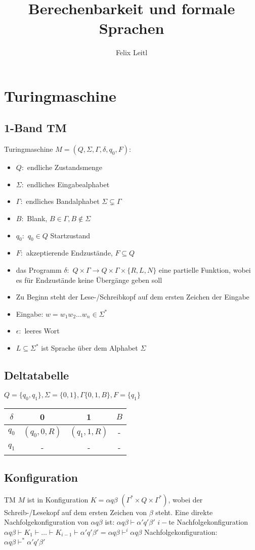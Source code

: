 \documentclass{article}
\title{Berechenbarkeit und formale Sprachen}
\author{Felix Leitl}
\begin{document}
\maketitle
\tableofcontents
\newpage
\section{Turingmaschine}
\subsection{1-Band TM}
Turingmaschine $M=(Q, \Sigma, \Gamma, \delta, q_0, F)$:
\begin{itemize}
	\item $Q:$ endliche Zustandsmenge
	\item $\Sigma:$ endliches Eingabealphabet
	\item $\Gamma:$ endliches Bandalphabet $\Sigma \subsetneq \Gamma$
	\item $B:$ Blank, $B\in\Gamma, B\notin\Sigma$
	\item $q_0:$ $q_0\in Q$ Startzustand
	\item $F:$ akzeptierende Endzustände, $F\subseteq Q$
	\item das Programm $\delta:$ $Q\times\Gamma\to Q\times\Gamma\times\{R,L,N\}$ eine partielle Funktion, wobei es für Endzustände keine Übergänge geben soll
	\item Zu Beginn steht der Lese-/Schreibkopf auf dem ersten Zeichen der Eingabe
	\item Eingabe: $w=w_1w_2\dots w_n\in\Sigma^*$
	\item $\epsilon:$ leeres Wort
	\item $L\subseteq\Sigma^*$ ist Sprache über dem Alphabet $\Sigma$
\end{itemize}
\subsection{Deltatabelle}
$Q=\{q_0, q_1\}, \Sigma = \{0, 1\}, \Gamma \{0, 1, B\}, F=\{q_1\}$ \newline \newline
\begin{tabular}{c|c|c|c}
	$\delta$ & 0 & 1 & $B$ \\
	\hline
	$q_0$ & $(q_0, 0, R)$ & $(q_1, 1, R)$ & - \\
	\hline
	$q_1$ & - & - & - 
\end{tabular}
\subsection{Konfiguration}
TM $M$ ist in Konfiguration $K=\alpha q \beta$ $(\Gamma^*\times Q \times \Gamma^*)$, wobei der Schreib-/Lesekopf auf dem ersten Zeichen von $\beta$ steht. \newline
Eine direkte Nachfolgekonfiguration von $\alpha q\beta$ ist: $\alpha q \beta \vdash \alpha'q'\beta'$ \newline
$i-$te Nachfolgekonfiguration $\alpha q \beta \vdash K_1 \vdash \dots \vdash K_{i-1} \vdash \alpha'q'\beta'=\alpha q\beta \vdash^i\alpha q\beta$ \newline
Nachfolgekonfiguration: $\alpha q \beta \vdash^* \alpha'q'\beta'$
\end{document}
